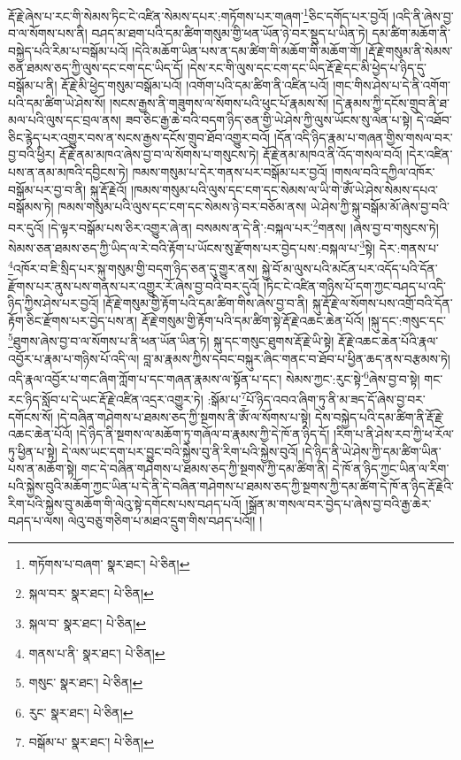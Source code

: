 རྡོ་རྗེ་ཞེས་པ་རང་གི་སེམས་ཏིང་ངེ་འཛིན་སེམས་དཔར་:གཏོགས་པར་གཞག་\footnote{གཏོགས་པ་བཞག་  སྣར་ཐང་།  པེ་ཅིན། }ཅིང་དགོད་པར་བྱའོ། །འདི་ནི་ཞེས་བྱ་བ་ལ་སོགས་པས་ནི། བཤད་མ་ཐག་པའི་དམ་ཚིག་གསུམ་གྱི་ཕན་ཡོན་ཉེ་བར་སྡུད་པ་ཡིན་ཏེ། དམ་ཚིག་མཆོག་ནི་བསྐྱེད་པའི་རིམ་པ་བསྒོམ་པའོ། །དེའི་མཆོག་ཡིན་པས་ན་དམ་ཚིག་གི་མཆོག་གི་མཆོག་གོ། །རྡོ་རྗེ་གསུམ་ནི་སེམས་ཅན་ཐམས་ཅད་ཀྱི་ལུས་དང་ངག་དང་ཡིད་དོ། །དེས་རང་གི་ལུས་དང་ངག་དང་ཡིད་རྡོ་རྗེ་དང་མི་ཕྱེད་པ་ཉིད་དུ་བསྒོམ་པ་ནི། རྡོ་རྗེ་མི་ཕྱེད་གསུམ་བསྒོམ་པའོ། །འགོག་པའི་དམ་ཚིག་ནི་འཛིན་པའོ། །གང་གིས་ཤེས་པ་དེ་ནི་འགོག་པའི་དམ་ཚིག་ཡེ་ཤེས་སོ། །སངས་རྒྱས་ནི་གཟུགས་ལ་སོགས་པའི་ཕུང་པོ་རྣམས་སོ། །དེ་རྣམས་ཀྱི་དངོས་གྲུབ་ནི་ཐ་མལ་པའི་ལུས་དང་བྲལ་ནས། ཟབ་ཅིང་རྒྱ་ཆེ་བའི་བདག་ཉིད་ཅན་གྱི་ཡེ་ཤེས་ཀྱི་ལུས་ཡོངས་སུ་ལེན་པ་སྟེ། དེ་འཐོབ་ཅིང་རྙེད་པར་འགྱུར་བས་ན་སངས་རྒྱས་དངོས་གྲུབ་ཐོབ་འགྱུར་བའོ། །དོན་འདི་ཉིད་རྣམ་པ་གཞན་གྱིས་གསལ་བར་བྱ་བའི་ཕྱིར། རྡོ་རྗེ་ནམ་མཁའ་ཞེས་བྱ་བ་ལ་སོགས་པ་གསུངས་ཏེ། རྡོ་རྗེ་ནམ་མཁའ་ནི་འོད་གསལ་བའོ། །དེར་འཛིན་པས་ན་ནམ་མཁའི་དབྱིངས་ཏེ། ཁམས་གསུམ་པ་དེར་གནས་པར་བསྒོམ་པར་བྱའོ། །གསལ་བའི་དཀྱིལ་འཁོར་བསྒོམ་པར་བྱ་བ་ནི། སྐུ་རྡོ་རྗེའོ། །ཁམས་གསུམ་པའི་ལུས་དང་ངག་དང་སེམས་ལ་ཡི་གེ་ཨོཾ་ཡེ་ཤེས་སེམས་དཔའ་བསྒོམས་ཏེ། ཁམས་གསུམ་པའི་ལུས་དང་ངག་དང་སེམས་ཉེ་བར་བཅོམ་ནས། ཡེ་ཤེས་ཀྱི་སྐུ་བསྒོམ་མོ་ཞེས་བྱ་བའི་བར་དུའོ། །དེ་ལྟར་བསྒོམ་པས་ཅིར་འགྱུར་ཞེ་ན། བསམས་ན་དེ་ནི་:བསྐལ་པར་\footnote{སྐལ་བར་  སྣར་ཐང་།  པེ་ཅིན། }གནས། །ཞེས་བྱ་བ་གསུངས་ཏེ། སེམས་ཅན་ཐམས་ཅད་ཀྱི་ཡིད་ལ་རེ་བའི་རྟོག་པ་ཡོངས་སུ་རྫོགས་པར་བྱེད་པས་:བསྐལ་པ་\footnote{སྐལ་བ་  སྣར་ཐང་།  པེ་ཅིན། }སྟེ། དེར་:གནས་པ་\footnote{གནས་པ་ནི་  སྣར་ཐང་།  པེ་ཅིན། }འཁོར་བ་ཇི་སྲིད་པར་སྐུ་གསུམ་གྱི་བདག་ཉིད་ཅན་དུ་གྱུར་ནས། སྐྱེ་བོ་མ་ལུས་པའི་མངོན་པར་འདོད་པའི་དོན་རྫོགས་པར་ནུས་པས་གནས་པར་འགྱུར་རོ་ཞེས་བྱ་བའི་བར་དུའོ། །ཏིང་ངེ་འཛིན་གཉིས་པོ་དག་ཀྱང་བཤད་པ་འདི་ཉིད་ཀྱིས་ཤེས་པར་བྱའོ། །རྡོ་རྗེ་གསུམ་གྱི་རྟོག་པའི་དམ་ཚིག་གིས་ཞེས་བྱ་བ་ནི། སྐུ་རྡོ་རྗེ་ལ་སོགས་པས་འགྲོ་བའི་དོན་རྟོག་ཅིང་རྫོགས་པར་བྱེད་པས་ན། རྡོ་རྗེ་གསུམ་གྱི་རྟོག་པའི་དམ་ཚིག་སྟེ་རྡོ་རྗེ་འཆང་ཆེན་པོའོ། །སྐུ་དང་:གསུང་དང་\footnote{གསུང་  སྣར་ཐང་།  པེ་ཅིན། }ཐུགས་ཞེས་བྱ་བ་ལ་སོགས་པ་ནི་ཕན་ཡོན་ཡིན་ཏེ། སྐུ་དང་གསུང་ཐུགས་རྡོ་རྗེ་ཡི་སྟེ། རྡོ་རྗེ་འཆང་ཆེན་པོའི་རྣལ་འབྱོར་པ་རྣམ་པ་གཉིས་པོ་འདི་ལ། བླ་མ་རྣམས་ཀྱིས་དབང་བསྐུར་ཞིང་གནང་བ་ཐོབ་པ་ཕྱིན་ཆད་ནས་བརྩམས་ཏེ། འདི་རྣལ་འབྱོར་པ་གང་ཞིག་ཀློག་པ་དང་གཞན་རྣམས་ལ་སྟོན་པ་དང་། སེམས་ཀྱང་:རུང་སྟེ་\footnote{རུང་  སྣར་ཐང་།  པེ་ཅིན། }ཞེས་བྱ་བ་སྟེ། གང་རང་ཉིད་སློབ་པ་དེ་ཡང་རྡོ་རྗེ་འཛིན་འདྲར་འགྱུར་ཏེ། :སྒོམ་པ་\footnote{བསྒོམ་པ་  སྣར་ཐང་།  པེ་ཅིན། }པོ་ཉིད་འབའ་ཞིག་ཏུ་ནི་མ་ཟད་དོ་ཞེས་བྱ་བར་དགོངས་སོ། །དེ་བཞིན་གཤེགས་པ་ཐམས་ཅད་ཀྱི་སྔགས་ནི་ཨོཾ་ལ་སོགས་པ་སྟེ། དེས་བསྐྱེད་པའི་དམ་ཚིག་ནི་རྡོ་རྗེ་འཆང་ཆེན་པོའོ། །དེ་ཉིད་ནི་སྔགས་ལ་མཆོག་ཏུ་གཞོལ་བ་རྣམས་ཀྱི་དེ་ཁོ་ན་ཉིད་དོ། །རིག་པ་ནི་ཤེས་རབ་ཀྱི་ཕ་རོལ་ཏུ་ཕྱིན་པ་སྟེ། དེ་ལས་ཡང་དག་པར་བྱུང་བའི་སྐྱེས་བུ་ནི་རིག་པའི་སྐྱེས་བུའོ། །དེ་ཉིད་ནི་ཡེ་ཤེས་ཀྱི་དམ་ཚིག་ཡིན་པས་ན་མཆོག་སྟེ། གང་དེ་བཞིན་གཤེགས་པ་ཐམས་ཅད་ཀྱི་སྔགས་ཀྱི་དམ་ཚིག་ནི། དེ་ཁོ་ན་ཉིད་ཀྱང་ཡིན་ལ་རིག་པའི་སྐྱེས་བུའི་མཆོག་ཀྱང་ཡིན་པ་དེ་ནི་དེ་བཞིན་གཤེགས་པ་ཐམས་ཅད་ཀྱི་སྔགས་ཀྱི་དམ་ཚིག་དེ་ཁོ་ན་ཉིད་རྡོ་རྗེའི་རིག་པའི་སྐྱེས་བུ་མཆོག་གི་ལེའུ་སྟེ་དགོངས་པས་བཤད་པའོ། །སྒྲོན་མ་གསལ་བར་བྱེད་པ་ཞེས་བྱ་བའི་རྒྱ་ཆེར་བཤད་པ་ལས། ལེའུ་བཅུ་གཅིག་པ་མཐའ་དྲུག་གིས་བཤད་པའོ།། །
